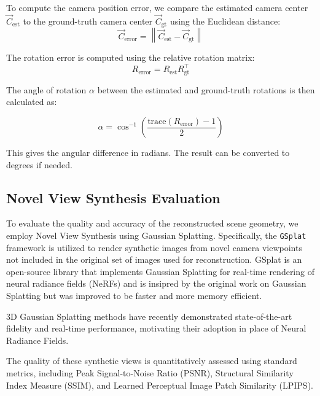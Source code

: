 To compute the camera position error, we compare the estimated camera center $\vec{C}_{\text{est}}$ to the ground-truth camera center $\vec{C}_{\text{gt}}$ using the Euclidean distance:
\begin{equation}
    \vec{C}_{\text{error}} = \left\| \vec{C}_{\text{est}} - \vec{C}_{\text{gt}} \right\|
\end{equation}

The rotation error is computed using the relative rotation matrix:
\begin{equation}
    R_{\text{error}} = R_{\text{est}} R_{\text{gt}}^\top
\end{equation}

The angle of rotation $\alpha$ between the estimated and ground-truth rotations is then calculated as:

\begin{equation}
    \alpha = \cos^{-1}\left( \frac{\text{trace}(R_{\text{error}}) - 1}{2} \right)
\end{equation}

This gives the angular difference in radians. The result can be converted to degrees if needed.


\subsection{Novel View Synthesis Evaluation}

To evaluate the quality and accuracy of the reconstructed scene geometry, we employ Novel View Synthesis using Gaussian Splatting.
Specifically, the \texttt{GSplat} \cite{ye2024gsplatopensourcelibrarygaussian} framework is utilized to render synthetic images from novel camera viewpoints not included in the original set of images used for reconstruction. 
GSplat is an open-source library that implements Gaussian Splatting for real-time rendering of neural radiance fields (NeRFs) and is insipred by the original work on Gaussian Splatting \cite{kerbl20233dgaussiansplattingrealtime} but was improved to be faster and more memory efficient.

3D Gaussian Splatting methods have recently demonstrated state-of-the-art fidelity and real-time performance, motivating their adoption in place of Neural Radiance Fields.

The quality of these synthetic views is quantitatively assessed using standard metrics, including Peak Signal-to-Noise Ratio (PSNR), Structural Similarity Index Measure (SSIM), and Learned Perceptual Image Patch Similarity (LPIPS). 

